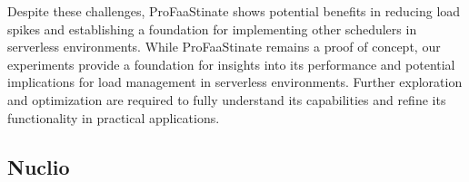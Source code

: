 Despite these challenges, ProFaaStinate shows potential benefits in reducing load spikes and establishing a foundation for implementing other schedulers in serverless environments.
While ProFaaStinate remains a proof of concept, our experiments provide a foundation for insights into its performance and potential implications for load management in serverless environments.
Further exploration and optimization are required to fully understand its capabilities and refine its functionality in practical applications.

\subsection{Nuclio}


